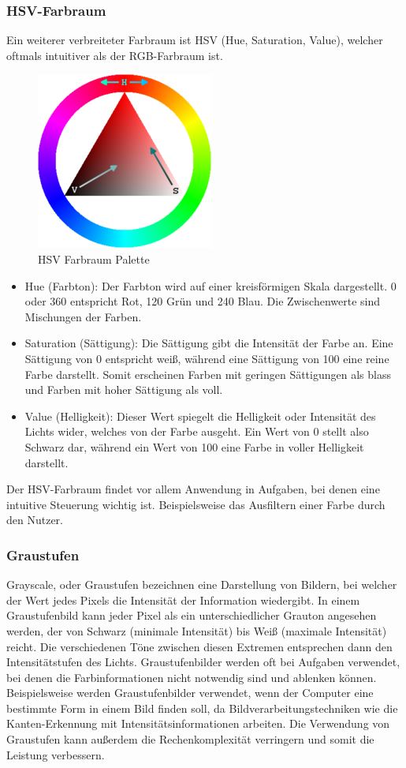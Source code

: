 \subsubsection{HSV-Farbraum}
Ein weiterer verbreiteter Farbraum ist HSV (Hue, Saturation, Value), welcher oftmals intuitiver als der 
RGB-Farbraum ist.
\begin{figure}[ht]
    \centering
    \includegraphics[scale=0.6]{images/HSV.png}
    \caption{HSV Farbraum Palette}
\end{figure}
\begin{itemize}
    \item Hue (Farbton): Der Farbton wird auf einer kreisförmigen Skala dargestellt. 
    0 oder 360 entspricht Rot, 120 Grün und 240 Blau. Die Zwischenwerte sind Mischungen der Farben.
    \item Saturation (Sättigung): Die Sättigung gibt die Intensität der Farbe an. 
    Eine Sättigung von 0 entspricht weiß, während eine Sättigung von 100 eine reine Farbe darstellt.
    Somit erscheinen Farben mit geringen Sättigungen als blass und Farben mit hoher Sättigung als voll.
    \item Value (Helligkeit): Dieser Wert spiegelt die Helligkeit oder Intensität des Lichts wider, welches von der Farbe ausgeht.
    Ein Wert von 0 stellt also Schwarz dar, während ein Wert von 100 eine Farbe in voller Helligkeit darstellt.
\end{itemize}
Der HSV-Farbraum findet vor allem Anwendung in Aufgaben, bei denen eine intuitive Steuerung wichtig ist. Beispielsweise das Ausfiltern einer Farbe durch den Nutzer.~\cite{Vladimir_Chernov_2023_sciencedirect}
\subsubsection{Graustufen}
Grayscale, oder Graustufen bezeichnen eine Darstellung von Bildern, bei welcher der Wert jedes Pixels die Intensität der Information wiedergibt.
In einem Graustufenbild kann jeder Pixel als ein unterschiedlicher Grauton angesehen werden, der von Schwarz (minimale Intensität) 
bis Weiß (maximale Intensität) reicht. Die verschiedenen Töne zwischen diesen Extremen entsprechen dann den Intensitätstufen des Lichts.
Graustufenbilder werden oft bei Aufgaben verwendet, bei denen die Farbinformationen nicht notwendig sind und ablenken können. 
Beispielsweise werden Graustufenbilder verwendet, wenn der Computer eine bestimmte Form in einem Bild finden soll, da 
Bildverarbeitungstechniken wie die Kanten-Erkennung mit Intensitätsinformationen arbeiten.
Die Verwendung von Graustufen kann außerdem die Rechenkomplexität verringern und somit die Leistung verbessern.


